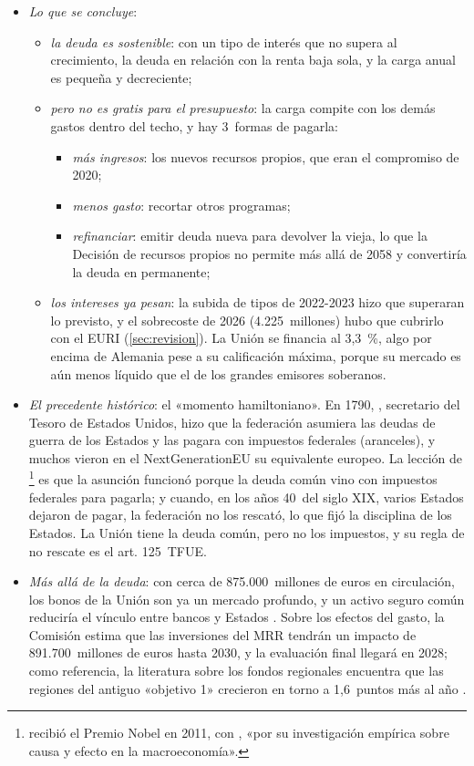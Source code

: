 \documentclass[11pt]{article}
\begin{document}
\begin{itemize}
\item \emph{Lo que se concluye}:
  \begin{itemize}
  \item \emph{la deuda es sostenible}: con un tipo de interés que no supera al crecimiento, la deuda en relación con la renta baja sola, y la carga anual es pequeña y decreciente;
  \item \emph{pero no es gratis para el presupuesto}: la carga compite con los demás gastos dentro del techo, y hay 3~formas de pagarla:
    \begin{itemize}
    \item \emph{más ingresos}: los nuevos recursos propios, que eran el compromiso de 2020;
    \item \emph{menos gasto}: recortar otros programas;
    \item \emph{refinanciar}: emitir deuda nueva para devolver la vieja, lo que la Decisión de recursos propios no permite más allá de 2058 y convertiría la deuda en permanente;
    \end{itemize}
  \item \emph{los intereses ya pesan}: la subida de tipos de 2022-2023 hizo que superaran lo previsto, y el sobrecoste de 2026 (4.225~millones) hubo que cubrirlo con el EURI (\ref{sec:revision}). La Unión se financia al 3,3~\%, algo por encima de Alemania pese a su calificación máxima, porque su mercado es aún menos líquido que el de los grandes emisores soberanos\nocite{CE2026Emisor}.
  \end{itemize}
\item \emph{El precedente histórico}: el «momento hamiltoniano». En 1790, , secretario del Tesoro de Estados Unidos, hizo que la federación asumiera las deudas de guerra de los Estados y las pagara con impuestos federales (aranceles), y muchos vieron en el NextGenerationEU su equivalente europeo. La lección de \textcite{Sargent2012United}\footnote{ recibió el Premio Nobel en 2011, con , «por su investigación empírica sobre causa y efecto en la macroeconomía»\nocite{Nobel2011SargentSims}.} es que la asunción funcionó porque la deuda común vino con impuestos federales para pagarla; y cuando, en los años 40~del siglo XIX, varios Estados dejaron de pagar, la federación no los rescató, lo que fijó la disciplina de los Estados. La Unión tiene la deuda común, pero no los impuestos, y su regla de no rescate es el art. 125~TFUE.
\item \emph{Más allá de la deuda}: con cerca de 875.000~millones de euros en circulación, los bonos de la Unión son ya un mercado profundo, y un activo seguro común reduciría el vínculo entre bancos y Estados . Sobre los efectos del gasto, la Comisión estima que las inversiones del MRR tendrán un impacto de 891.700~millones de euros hasta 2030\nocite{CE2026InformeMRR}, y la evaluación final llegará en 2028; como referencia, la literatura sobre los fondos regionales encuentra que las regiones del antiguo «objetivo 1» crecieron en torno a 1,6~puntos más al año\nocite{BeckerEggerVonEhrlich2010} .

\end{itemize}
\end{document}

